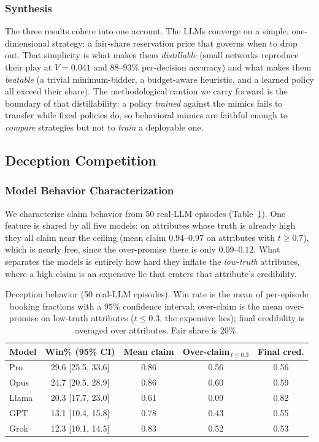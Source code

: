 \documentclass[conference]{IEEEtran}
\begin{document}
\subsubsection{Synthesis}
The three results cohere into one account. The LLMs converge on a simple, one-dimensional strategy: a fair-share reservation price that governs when to drop out. That simplicity is what makes them \emph{distillable} (small networks reproduce their play at $V = 0.041$ and $88$--$93\%$ per-decision accuracy) and what makes them \emph{beatable} (a trivial minimum-bidder, a budget-aware heuristic, and a learned policy all exceed their share). The methodological caution we carry forward is the boundary of that distillability: a policy \emph{trained} against the mimics fails to transfer while fixed policies do, so behavioral mimics are faithful enough to \emph{compare} strategies but not to \emph{train} a deployable one.

\subsection{Deception Competition}

\subsubsection{Model Behavior Characterization}
We characterize claim behavior from $50$ real-LLM episodes (Table~\ref{tab:dec5_behavior}). One feature is shared by all five models: on attributes whose truth is already high they all claim near the ceiling (mean claim $0.94$--$0.97$ on attributes with $t\ge0.7$), which is nearly free, since the over-promise there is only $0.09$--$0.12$. What separates the models is entirely how hard they inflate the \emph{low-truth} attributes, where a high claim is an expensive lie that craters that attribute's credibility.

\begin{table}[htbp]
\caption{Deception behavior (50 real-LLM episodes). Win rate is the mean of per-episode booking fractions with a $95\%$ confidence interval; over-claim is the mean over-promise on low-truth attributes ($t\le0.3$, the expensive lies); final credibility is averaged over attributes. Fair share is $20\%$.}
\label{tab:dec5_behavior}
\centering
\begin{tabular}{lcccc}
\hline
Model & Win\% (95\% CI) & Mean claim & Over-claim$_{\,t\le0.3}$ & Final cred. \\
\hline
Pro   & 29.6 [25.5, 33.6] & 0.86 & 0.56 & 0.56 \\
Opus  & 24.7 [20.5, 28.9] & 0.86 & 0.60 & 0.59 \\
Llama & 20.3 [17.7, 23.0] & 0.61 & 0.09 & 0.82 \\
GPT   & 13.1 [10.4, 15.8] & 0.78 & 0.43 & 0.55 \\
Grok  & 12.3 [10.1, 14.5] & 0.83 & 0.52 & 0.53 \\
\hline
\end{tabular}
\end{table}
\end{document}
